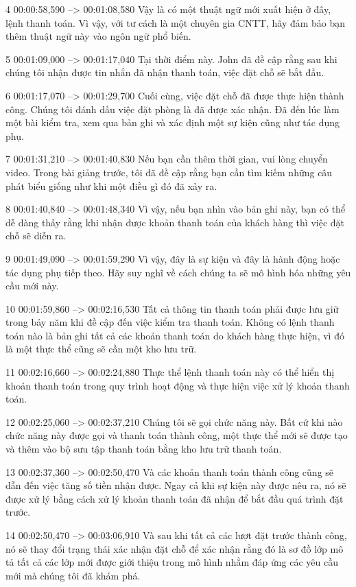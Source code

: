 4
00:00:58,590 --> 00:01:08,580
Vậy là có một thuật ngữ mới xuất hiện ở đây, lệnh thanh toán.  Vì vậy, với tư cách là một chuyên gia CNTT, hãy đảm bảo bạn thêm thuật ngữ này vào ngôn ngữ phổ biến.

5
00:01:09,000 --> 00:01:17,040
Tại thời điểm này.  John đã đề cập rằng sau khi chúng tôi nhận được tin nhắn đã nhận thanh toán, việc đặt chỗ sẽ bắt đầu.

6
00:01:17,070 --> 00:01:29,700
Cuối cùng, việc đặt chỗ đã được thực hiện thành công.  Chúng tôi đánh dấu việc đặt phòng là đã được xác nhận.  Đã đến lúc làm một bài kiểm tra, xem qua bản ghi và xác định một sự kiện cũng như tác dụng phụ.

7
00:01:31,210 --> 00:01:40,830
Nếu bạn cần thêm thời gian, vui lòng chuyển video.  Trong bài giảng trước, tôi đã đề cập rằng bạn cần tìm kiếm những câu phát biểu giống như khi một điều gì đó đã xảy ra.

8
00:01:40,840 --> 00:01:48,340
Vì vậy, nếu bạn nhìn vào bản ghi này, bạn có thể dễ dàng thấy rằng khi nhận được khoản thanh toán của khách hàng thì việc đặt chỗ sẽ diễn ra.

9
00:01:49,090 --> 00:01:59,290
Vì vậy, đây là sự kiện và đây là hành động hoặc tác dụng phụ tiếp theo.  Hãy suy nghĩ về cách chúng ta sẽ mô hình hóa những yêu cầu mới này.

10
00:01:59,860 --> 00:02:16,530
Tất cả thông tin thanh toán phải được lưu giữ trong bảy năm khi đề cập đến việc kiểm tra thanh toán.  Không có lệnh thanh toán nào là bản ghi tất cả các khoản thanh toán do khách hàng thực hiện, vì đó là một thực thể cũng sẽ cần một kho lưu trữ.

11
00:02:16,660 --> 00:02:24,880
Thực thể lệnh thanh toán này có thể hiển thị khoản thanh toán trong quy trình hoạt động và thực hiện việc xử lý khoản thanh toán.

12
00:02:25,060 --> 00:02:37,210
Chúng tôi sẽ gọi chức năng này.  Bất cứ khi nào chức năng này được gọi và thanh toán thành công, một thực thể mới sẽ được tạo và thêm vào bộ sưu tập thanh toán bằng kho lưu trữ thanh toán.

13
00:02:37,360 --> 00:02:50,470
Và các khoản thanh toán thành công cũng sẽ dẫn đến việc tăng số tiền nhận được.  Ngay cả khi sự kiện này được nêu ra, nó sẽ được xử lý bằng cách xử lý khoản thanh toán đã nhận để bắt đầu quá trình đặt trước.

14
00:02:50,470 --> 00:03:06,910
Và sau khi tất cả các lượt đặt trước thành công, nó sẽ thay đổi trạng thái xác nhận đặt chỗ để xác nhận rằng đó là sơ đồ lớp mô tả tất cả các lớp mới được giới thiệu trong mô hình nhằm đáp ứng các yêu cầu mới mà chúng tôi đã khám phá.

